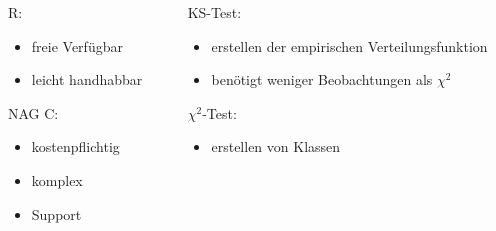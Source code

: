 \documentclass{beamer}
\begin{document}
\begin{frame}{\insertsection}

\begin{columns}
\begin{column}{.48\textwidth}
R:
	\begin{itemize}
		\item freie Verfügbar
		\item leicht handhabbar
	\end{itemize}
\vspace{1cm}
NAG C:
	\begin{itemize}
		\item kostenpflichtig
		\item komplex
		\item Support
	\end{itemize}
\end{column}

\hfill
\begin{column}{.48\textwidth}
KS-Test:
	\begin{itemize}
		\item erstellen der empirischen Verteilungsfunktion
		\item benötigt weniger Beobachtungen als $\chi^2$
	\end{itemize}
\vspace{1cm}
$\chi^2$-Test:
	\begin{itemize}
		\item erstellen von Klassen
	\end{itemize}
\end{column}
\end{columns}




\end{frame}
\end{document}
